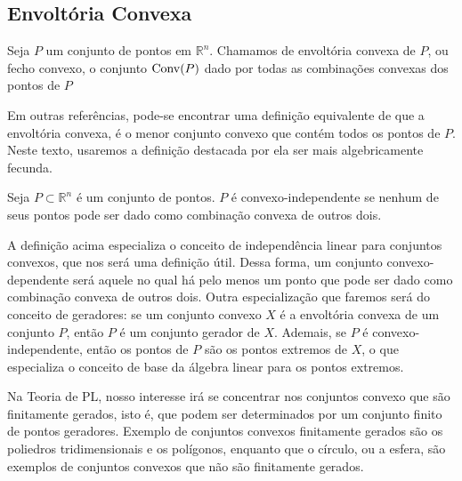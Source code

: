 \subsection{Envoltória Convexa}

\begin{def:convex hull}
	\label{def:convex hull}
	Seja $P$ um conjunto de pontos em $\mathbb{R}^n$. Chamamos de envoltória
	convexa de $P$, ou fecho convexo, o conjunto
	$\mathrm{Conv}(P)$ dado por todas as combinações convexas dos pontos de $P$
\end{def:convex hull}

Em outras referências, pode-se encontrar uma definição equivalente de que a
envoltória convexa, é o menor conjunto convexo que contém todos os pontos de $P$.
Neste texto, usaremos a definição destacada por ela ser mais algebricamente fecunda.

\begin{def:independencia convexa}
	Seja $P \subset \mathbb{R}^n$ é um conjunto de pontos. $P$ é convexo-independente
	se nenhum de seus pontos pode ser dado como combinação convexa de outros dois.
\end{def:independencia convexa}

A definição acima especializa o conceito de independência linear para conjuntos convexos,
que nos será uma definição útil. Dessa forma, um conjunto convexo-dependente será aquele
no qual há pelo menos um ponto que pode ser dado como combinação convexa de outros dois.
Outra especialização que faremos será do conceito de geradores: se um conjunto convexo
$X$ é a envoltória convexa de um conjunto $P$, então $P$ é um conjunto gerador de $X$.
Ademais, se $P$ é convexo-independente, então os pontos de $P$ são os pontos extremos
de $X$, o que especializa o conceito de base da álgebra linear para os pontos extremos.

Na Teoria de PL, nosso interesse irá se concentrar nos conjuntos convexo que são
finitamente gerados, isto é, que podem ser determinados por um conjunto finito
de pontos geradores. Exemplo de conjuntos convexos finitamente gerados são
os poliedros tridimensionais e os polígonos, enquanto que o círculo, ou a esfera,
são exemplos de conjuntos convexos que não são finitamente gerados.

